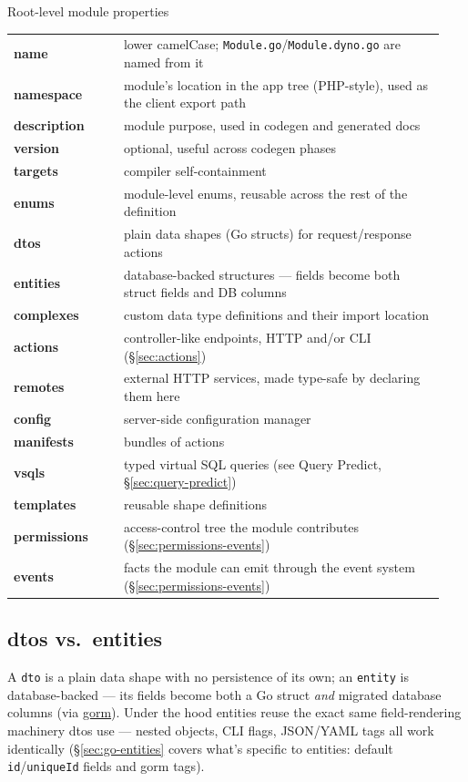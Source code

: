 \begin{sidebar}{Root-level module properties}
\small
\begin{tabular}{@{}p{0.24\linewidth}p{0.7\linewidth}@{}}
\textbf{name} & lower camelCase; \texttt{Module.go}/\texttt{Module.dyno.go} are named from it \\
\textbf{namespace} & module's location in the app tree (PHP-style), used as the client export path \\
\textbf{description} & module purpose, used in codegen and generated docs \\
\textbf{version} & optional, useful across codegen phases \\
\textbf{targets} & compiler self-containment \\
\textbf{enums} & module-level enums, reusable across the rest of the definition \\
\textbf{dtos} & plain data shapes (Go structs) for request/response actions \\
\textbf{entities} & database-backed structures --- fields become both struct fields and DB columns \\
\textbf{complexes} & custom data type definitions and their import location \\
\textbf{actions} & controller-like endpoints, HTTP and/or CLI (\S\ref{sec:actions}) \\
\textbf{remotes} & external HTTP services, made type-safe by declaring them here \\
\textbf{config} & server-side configuration manager \\
\textbf{manifests} & bundles of actions \\
\textbf{vsqls} & typed virtual SQL queries (see Query Predict, \S\ref{sec:query-predict}) \\
\textbf{templates} & reusable shape definitions \\
\textbf{permissions} & access-control tree the module contributes (\S\ref{sec:permissions-events}) \\
\textbf{events} & facts the module can emit through the event system (\S\ref{sec:permissions-events}) \\
\end{tabular}
\end{sidebar}

\subsection{dtos vs.\ entities}
A \texttt{dto} is a plain data shape with no persistence of its own; an
\texttt{entity} is database-backed --- its fields become both a Go struct
\emph{and} migrated database columns (via \href{https://gorm.io}{gorm}).
Under the hood entities reuse the exact same field-rendering machinery
dtos use --- nested objects, CLI flags, JSON/YAML tags all work
identically (\S\ref{sec:go-entities} covers what's specific to entities:
default \texttt{id}/\texttt{uniqueId} fields and gorm tags).

